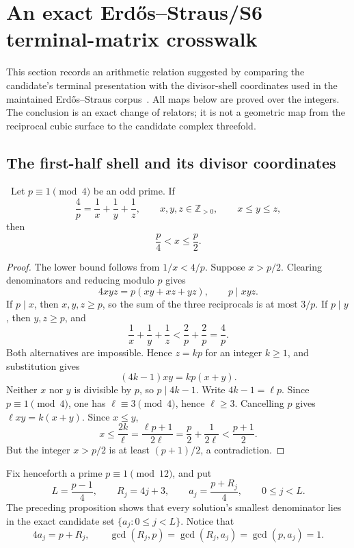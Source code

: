 \section{An exact Erd\H{o}s--Straus/S6 terminal-matrix crosswalk}
\label{sec:es-s6-crosswalk}

This section records an arithmetic relation suggested by comparing the
candidate's terminal presentation with the divisor-shell coordinates used in
the maintained Erd\H{o}s--Straus corpus~\cite{ClankersES2026}.  All maps below
are proved over the integers.  The conclusion is an exact change of relators;
it is not a geometric map from the reciprocal cubic surface to the candidate
complex threefold.

\subsection{The first-half shell and its divisor coordinates}

\begin{proposition}
\label{prop:es-first-half-denominator}
\Verified\ Let \(p\equiv1\pmod4\) be an odd prime.  If
\[
 \frac4p=\frac1x+\frac1y+\frac1z,
 \qquad x,y,z\in\mathbb Z_{>0},\qquad x\le y\le z,
\]
then
\[
 \frac p4<x\le\frac p2.
\]
\end{proposition}

\begin{proof}
The lower bound follows from \(1/x<4/p\).  Suppose \(x>p/2\).  Clearing
denominators and reducing modulo \(p\) gives
\[
 4xyz=p(xy+xz+yz),\qquad p\mid xyz.
\]
If \(p\mid x\), then \(x,y,z\ge p\), so the sum of the three reciprocals is
at most \(3/p\).  If \(p\mid y\), then \(y,z\ge p\), and
\[
 \frac1x+\frac1y+\frac1z<\frac2p+\frac2p=\frac4p.
\]
Both alternatives are impossible.  Hence \(z=kp\) for an integer \(k\ge1\),
and substitution gives
\[
 (4k-1)xy=kp(x+y).
\]
Neither \(x\) nor \(y\) is divisible by \(p\), so \(p\mid4k-1\).  Write
\(4k-1=\ell p\).  Since \(p\equiv1\pmod4\), one has
\(\ell\equiv3\pmod4\), hence \(\ell\ge3\).  Cancelling \(p\) gives
\(\ell xy=k(x+y)\).  Since \(x\le y\),
\[
 x\le\frac{2k}{\ell}
   =\frac{\ell p+1}{2\ell}
   =\frac p2+\frac1{2\ell}<\frac{p+1}{2}.
\]
But the integer \(x>p/2\) is at least \((p+1)/2\), a contradiction.
\end{proof}

Fix henceforth a prime \(p\equiv1\pmod{12}\), and put
\[
 L=\frac{p-1}{4},\qquad
 R_j=4j+3,\qquad
 a_j=\frac{p+R_j}{4},\qquad 0\le j<L.
\]
The preceding proposition shows that every solution's smallest denominator
lies in the exact candidate set \(\{a_j:0\le j<L\}\).  Notice that
\[
 4a_j=p+R_j,\qquad
 \gcd(R_j,p)=\gcd(R_j,a_j)=\gcd(p,a_j)=1.
\]

